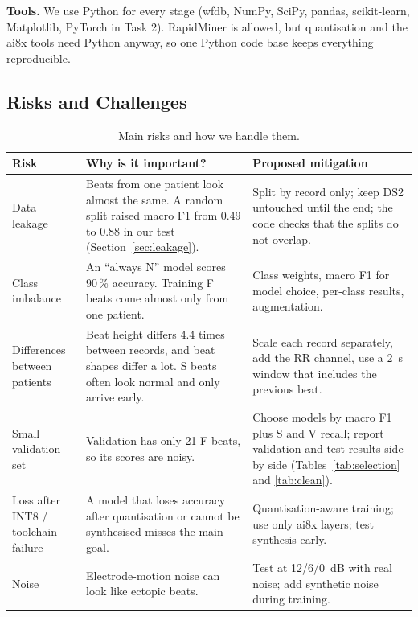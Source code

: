 \documentclass[11pt,a4paper]{article}
\begin{document}
\textbf{Tools.} We use Python for every stage (wfdb, NumPy, SciPy, pandas, scikit-learn, Matplotlib, PyTorch in Task 2). RapidMiner is allowed, but quantisation and the ai8x tools need Python anyway, so one Python code base keeps everything reproducible.

\subsection{Risks and Challenges}

\begin{table}[H]
\centering
\small
\caption{Main risks and how we handle them.}
\label{tab:risks}
\begin{tabularx}{\textwidth}{@{} >{\raggedright\arraybackslash}p{3.0cm} L L @{}}
\toprule
Risk & Why is it important? & Proposed mitigation \\
\midrule
Data leakage & Beats from one patient look almost the same. A random split raised macro F1 from 0.49 to 0.88 in our test (Section~\ref{sec:leakage}). & Split by record only; keep DS2 untouched until the end; the code checks that the splits do not overlap. \\
Class imbalance & An ``always N'' model scores 90\,\% accuracy. Training F beats come almost only from one patient. & Class weights, macro F1 for model choice, per-class results, augmentation. \\
Differences between patients & Beat height differs 4.4 times between records, and beat shapes differ a lot. S beats often look normal and only arrive early. & Scale each record separately, add the RR channel, use a 2~s window that includes the previous beat. \\
Small validation set & Validation has only 21 F beats, so its scores are noisy. & Choose models by macro F1 plus S and V recall; report validation and test results side by side (Tables~\ref{tab:selection} and \ref{tab:clean}). \\
Loss after INT8 / toolchain failure & A model that loses accuracy after quantisation or cannot be synthesised misses the main goal. & Quantisation-aware training; use only ai8x layers; test synthesis early. \\
Noise & Electrode-motion noise can look like ectopic beats. & Test at 12/6/0~dB with real noise; add synthetic noise during training. \\
\bottomrule
\end{tabularx}
\end{table}

\end{document}
